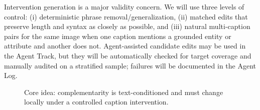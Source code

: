 \documentclass[10pt,twocolumn]{article}
\begin{document}
Intervention generation is a major validity concern. We will use three levels of control: (i) deterministic phrase removal/generalization, (ii) matched edits that preserve length and syntax as closely as possible, and (iii) natural multi-caption pairs for the same image when one caption mentions a grounded entity or attribute and another does not. Agent-assisted candidate edits may be used in the Agent Track, but they will be automatically checked for target coverage and manually audited on a stratified sample; failures will be documented in the Agent Log.

\begin{figure}[t]
\centering
{}
\caption{Core idea: complementarity is text-conditioned and must change locally under a controlled caption intervention.}
\label{fig:overview}
\vspace{-1mm}
\end{figure}
\end{document}
